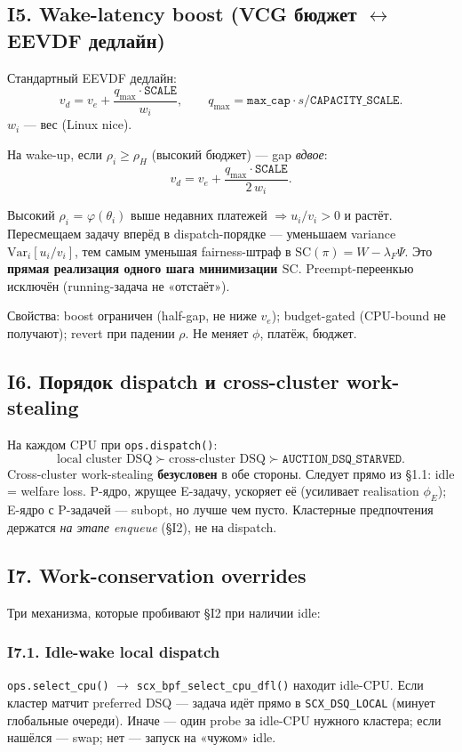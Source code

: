 \documentclass[11pt,a4paper]{article}
\begin{document}
\subsection{I5. Wake-latency boost (VCG бюджет $\leftrightarrow$ EEVDF дедлайн)}

Стандартный EEVDF дедлайн:
\[
v_d = v_e + \frac{q_{\max}\cdot\mathtt{SCALE}}{w_i},
\qquad q_{\max}=\mathtt{max\_cap}\cdot s/\mathtt{CAPACITY\_SCALE}.
\]
$w_i$ — вес (Linux nice).

На wake-up, если $\rho_i\geq\rho_H$ (высокий бюджет) — gap \emph{вдвое}:
\[
v_d = v_e + \frac{q_{\max}\cdot\mathtt{SCALE}}{2\,w_i}.
\]

\begin{why}[SC-интерпретация]
Высокий $\rho_i$ = $\varphi(\theta_i)$ выше недавних платежей
$\Rightarrow u_i/v_i>0$ и растёт. Пересмещаем задачу вперёд в
dispatch-порядке — уменьшаем variance $\mathrm{Var}_i[u_i/v_i]$,
тем самым уменьшая fairness-штраф в $\mathrm{SC}(\pi)=W-\lambda_F\Psi$.
Это \textbf{прямая реализация одного шага минимизации
$\mathrm{SC}$}. Preempt-переенкью исключён (running-задача не
«отстаёт»).
\end{why}

Свойства: boost ограничен (half-gap, не ниже $v_e$); budget-gated
(CPU-bound не получают); revert при падении $\rho$. Не меняет $\phi$,
платёж, бюджет.

\subsection{I6. Порядок dispatch и cross-cluster work-stealing}

На каждом CPU при \texttt{ops.dispatch()}:
\[
\text{local cluster DSQ} \succ \text{cross-cluster DSQ} \succ \mathtt{AUCTION\_DSQ\_STARVED}.
\]
Cross-cluster work-stealing \textbf{безусловен} в обе стороны.
Следует прямо из §1.1: idle = welfare loss. P-ядро, жрущее E-задачу,
ускоряет её (усиливает realisation $\phi_E$); E-ядро с P-задачей —
subopt, но лучше чем пусто. Кластерные предпочтения держатся
\emph{на этапе enqueue} (§I2), не на dispatch.

\subsection{I7. Work-conservation overrides}

Три механизма, которые пробивают §I2 при наличии idle:

\subsubsection*{I7.1. Idle-wake local dispatch}
\texttt{ops.select\_cpu()} $\to$ \texttt{scx\_bpf\_select\_cpu\_dfl()}
находит idle-CPU. Если кластер матчит preferred DSQ — задача идёт
прямо в \texttt{SCX\_DSQ\_LOCAL} (минует глобальные очереди).
Иначе — один probe за idle-CPU нужного кластера; если нашёлся —
swap; нет — запуск на «чужом» idle.
\end{document}
